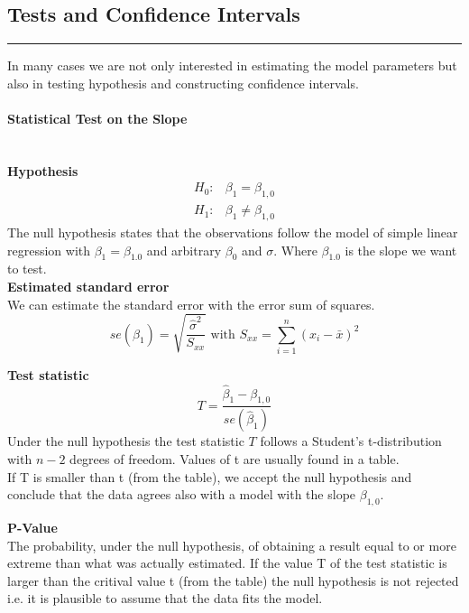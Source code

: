 \subsection{Tests and Confidence Intervals}
\noindent\rule[\linienAbstand]{\linewidth}{\linienDicke}
In many cases we are not only interested in estimating the model parameters but also in testing hypothesis and constructing confidence intervals.\\

\paragraph{Statistical Test on the Slope}\mbox{}\\
\textbf{Hypothesis}
\begin{equation}
  \begin{split}
    H_0:& \beta_1 = \beta_{1,0}\\
    H_1:& \beta_1 \neq \beta_{1,0}
  \end{split}
\end{equation}
The null hypothesis states that the observations follow the model of simple linear regression with $\beta_{1} = \beta_{1.0}$ and arbitrary $\beta_0$ and $\sigma$. Where $\beta_{1.0}$ is the slope we want to test.\\

\textbf{Estimated standard error}\\
We can estimate the standard error with the error sum of squares.
\begin{equation}
  se(\hat{\beta}_1) = \sqrt{\frac{\hat{\sigma}^2}{S_{xx}}} \text{    with    } S_{xx} =  \sum^n_{i=1}(x_i - \bar{x})^2
\end{equation}

\textbf{Test statistic}
\begin{equation}
  T = \frac{\hat{\beta}_1 - \beta_{1,0}}{se(\hat{\beta}_1)}
\end{equation}
Under the null hypothesis the test statistic $T$ follows a Student’s t-distribution with $n - 2$ degrees of freedom. Values of t are usually found in a table.\\
If T is smaller than t (from the table), we accept the null hypothesis and conclude that the data agrees also with a model with the slope $\beta_{1,0}$.


\textbf{P-Value}\\
The probability, under the null hypothesis, of obtaining a result equal to or more extreme than what was actually estimated. If the value T of the test statistic is larger than the critival value t (from the table) the null hypothesis is not rejected i.e. it is plausible to assume that the data fits the model.

